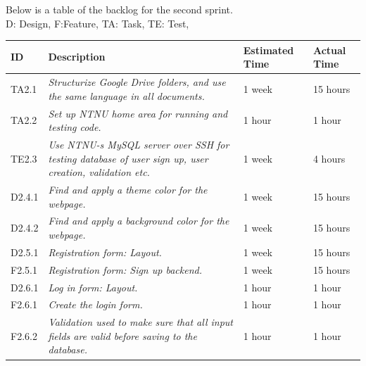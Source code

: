 Below is a table of the backlog for the second sprint. \\ D: Design, F:Feature, TA: Task, TE: Test, 

\begin{minipage}{\linewidth}
\setlength{\tabcolsep}{12pt}
\centering
{}
\begin{tabular}{|p{1cm}|p{4cm}|p{2cm}|p{2cm}|}
\hline
\cellcolor{gray!25} ID & \cellcolor{gray!25} Description & \cellcolor{gray!25} Estimated Time & \cellcolor{gray!25} Actual Time \\
\hline
TA2.1 & \it{Structurize Google Drive folders, and use the same language in all documents.} & 1 week & 15 hours \\
TA2.2 & \it{Set up NTNU home area for running and testing code.} & 1 hour & 1 hour \\
TE2.3 & \it{Use NTNU-s MySQL server over SSH for testing database of user sign up, user creation, validation etc. } & 1 week & 4 hours \\
D2.4.1 & \it{Find and apply a theme color for the webpage. } & 1 week & 15 hours \\
D2.4.2 & \it{Find and apply a background color for the webpage.} & 1 week & 15 hours \\
D2.5.1 & \it{Registration form: Layout.} & 1 week & 15 hours \\
F2.5.1 & \it{Registration form: Sign up backend.} & 1 week & 15 hours \\
D2.6.1 & \it{Log in form: Layout.} & 1 hour & 1 hour \\
F2.6.1 & \it{Create the login form.} & 1 hour & 1 hour \\
F2.6.2 & \it{Validation used to make sure that all input fields are valid before saving to the database. } & 1 hour & 1 hour \\
\hline
\end{tabular}
\end{minipage}

